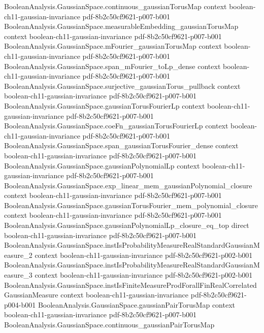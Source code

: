 \begin{lemma}
\proofstep
  {BooleanAnalysis.GaussianSpace.continuous_gaussianTorusMap}
  {context}
  {boolean-ch11-gaussian-invariance}
  {pdf-8b2c50cf9621-p007-b001}
\proofstep
  {BooleanAnalysis.GaussianSpace.measurableEmbedding_gaussianTorusMap}
  {context}
  {boolean-ch11-gaussian-invariance}
  {pdf-8b2c50cf9621-p007-b001}
\proofstep
  {BooleanAnalysis.GaussianSpace.mFourier_gaussianTorusMap}
  {context}
  {boolean-ch11-gaussian-invariance}
  {pdf-8b2c50cf9621-p007-b001}
\proofstep
  {BooleanAnalysis.GaussianSpace.span_mFourier_toLp_dense}
  {context}
  {boolean-ch11-gaussian-invariance}
  {pdf-8b2c50cf9621-p007-b001}
\proofstep
  {BooleanAnalysis.GaussianSpace.surjective_gaussianTorus_pullback}
  {context}
  {boolean-ch11-gaussian-invariance}
  {pdf-8b2c50cf9621-p007-b001}
\proofstep
  {BooleanAnalysis.GaussianSpace.gaussianTorusFourierLp}
  {context}
  {boolean-ch11-gaussian-invariance}
  {pdf-8b2c50cf9621-p007-b001}
\proofstep
  {BooleanAnalysis.GaussianSpace.coeFn_gaussianTorusFourierLp}
  {context}
  {boolean-ch11-gaussian-invariance}
  {pdf-8b2c50cf9621-p007-b001}
\proofstep
  {BooleanAnalysis.GaussianSpace.span_gaussianTorusFourier_dense}
  {context}
  {boolean-ch11-gaussian-invariance}
  {pdf-8b2c50cf9621-p007-b001}
\proofstep
  {BooleanAnalysis.GaussianSpace.gaussianPolynomialLp}
  {context}
  {boolean-ch11-gaussian-invariance}
  {pdf-8b2c50cf9621-p007-b001}
\proofstep
  {BooleanAnalysis.GaussianSpace.exp_linear_mem_gaussianPolynomial_closure}
  {context}
  {boolean-ch11-gaussian-invariance}
  {pdf-8b2c50cf9621-p007-b001}
\proofstep
  {BooleanAnalysis.GaussianSpace.gaussianTorusFourier_mem_polynomial_closure}
  {context}
  {boolean-ch11-gaussian-invariance}
  {pdf-8b2c50cf9621-p007-b001}
\proofstep
  {BooleanAnalysis.GaussianSpace.gaussianPolynomialLp_closure_eq_top}
  {direct}
  {boolean-ch11-gaussian-invariance}
  {pdf-8b2c50cf9621-p007-b001}
\proofstep
  {BooleanAnalysis.GaussianSpace.instIsProbabilityMeasureRealStandardGaussianMeasure_2}
  {context}
  {boolean-ch11-gaussian-invariance}
  {pdf-8b2c50cf9621-p002-b001}
\proofstep
  {BooleanAnalysis.GaussianSpace.instIsProbabilityMeasureRealStandardGaussianMeasure_3}
  {context}
  {boolean-ch11-gaussian-invariance}
  {pdf-8b2c50cf9621-p002-b001}
\proofstep
  {BooleanAnalysis.GaussianSpace.instIsFiniteMeasureProdForallFinRealCorrelatedGaussianMeasure}
  {context}
  {boolean-ch11-gaussian-invariance}
  {pdf-8b2c50cf9621-p004-b001}
\proofstep
  {BooleanAnalysis.GaussianSpace.gaussianPairTorusMap}
  {context}
  {boolean-ch11-gaussian-invariance}
  {pdf-8b2c50cf9621-p007-b001}
\proofstep
  {BooleanAnalysis.GaussianSpace.continuous_gaussianPairTorusMap}

\end{lemma}
